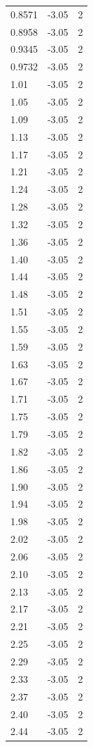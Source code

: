 \begin{longtable}{lrr}
  0.8571 & -3.05 & 2 \\
  0.8958 & -3.05 & 2 \\
  0.9345 & -3.05 & 2 \\
  0.9732 & -3.05 & 2 \\
  1.01 & -3.05 & 2 \\
  1.05 & -3.05 & 2 \\
  1.09 & -3.05 & 2 \\
  1.13 & -3.05 & 2 \\
  1.17 & -3.05 & 2 \\
  1.21 & -3.05 & 2 \\
  1.24 & -3.05 & 2 \\
  1.28 & -3.05 & 2 \\
  1.32 & -3.05 & 2 \\
  1.36 & -3.05 & 2 \\
  1.40 & -3.05 & 2 \\
  1.44 & -3.05 & 2 \\
  1.48 & -3.05 & 2 \\
  1.51 & -3.05 & 2 \\
  1.55 & -3.05 & 2 \\
  1.59 & -3.05 & 2 \\
  1.63 & -3.05 & 2 \\
  1.67 & -3.05 & 2 \\
  1.71 & -3.05 & 2 \\
  1.75 & -3.05 & 2 \\
  1.79 & -3.05 & 2 \\
  1.82 & -3.05 & 2 \\
  1.86 & -3.05 & 2 \\
  1.90 & -3.05 & 2 \\
  1.94 & -3.05 & 2 \\
  1.98 & -3.05 & 2 \\
  2.02 & -3.05 & 2 \\
  2.06 & -3.05 & 2 \\
  2.10 & -3.05 & 2 \\
  2.13 & -3.05 & 2 \\
  2.17 & -3.05 & 2 \\
  2.21 & -3.05 & 2 \\
  2.25 & -3.05 & 2 \\
  2.29 & -3.05 & 2 \\
  2.33 & -3.05 & 2 \\
  2.37 & -3.05 & 2 \\
  2.40 & -3.05 & 2 \\
  2.44 & -3.05 & 2 \\

\end{longtable}
